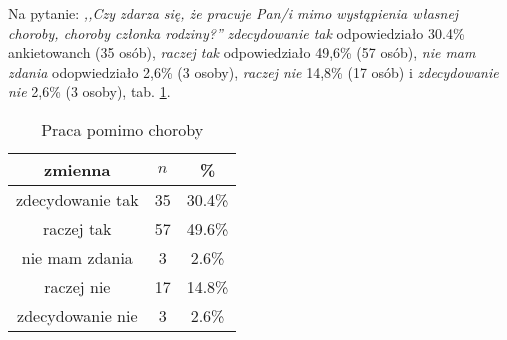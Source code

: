 Na pytanie: \textit{,,Czy zdarza się, że pracuje Pan/i mimo wystąpienia własnej choroby, choroby członka rodziny?''} \textit{zdecydowanie tak} odpowiedziało 30.4\% ankietowanch (35 osób), \textit{raczej tak} odpowiedziało 49,6\% (57 osób), \textit{nie mam zdania} odopwiedziało 2,6\% (3 osoby), \textit{raczej nie} 14,8\% (17 osób) i \textit{zdecydowanie nie} 2,6\% (3 osoby), tab. \ref{tab:Q31}.

\begin{table}[H]
\caption{Praca pomimo choroby}
\centering
\begin{tabular}{ | c | c | c |}
\hline
zmienna & $n$ & \% \\
\hline
zdecydowanie tak  &  35  & 30.4\% \\
\hline
raczej tak  &  57  & 49.6\% \\
\hline
nie mam zdania  &  3  & 2.6\% \\
\hline
raczej nie  &  17  & 14.8\% \\
\hline
zdecydowanie nie  &  3  & 2.6\% \\
\hline
\end{tabular}
\label{tab:Q31}
\end{table}
